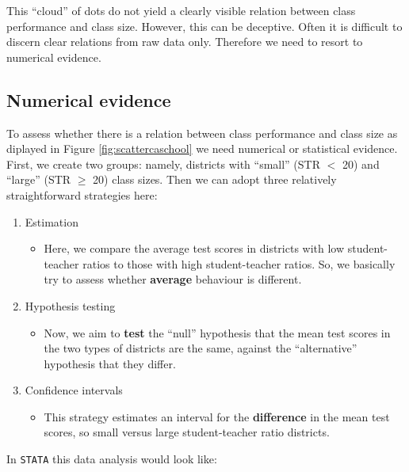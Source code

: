 \documentclass[
]{book}
\providecommand{\tightlist}{%
  \setlength{\itemsep}{0pt}\setlength{\parskip}{0pt}}
\begin{document}
This ``cloud'' of dots do not yield a clearly visible relation between class performance and class size. However, this can be deceptive. Often it is difficult to discern clear relations from raw data only. Therefore we need to resort to numerical evidence.

\hypertarget{sec:numevidence}{%
\subsection{Numerical evidence}\label{sec:numevidence}}

To assess whether there is a relation between class performance and class size as diplayed in Figure \ref{fig:scattercaschool} we need numerical or statistical evidence. First, we create two groups: namely, districts with ``small'' (STR \(<\) 20) and ``large'' (STR \(\geq\) 20) class sizes. Then we can adopt three relatively straightforward strategies here:

\begin{enumerate}
\def\labelenumi{\arabic{enumi}.}
\tightlist
\item
  Estimation

  \begin{itemize}
  \tightlist
  \item
    Here, we compare the average test scores in districts with low student-teacher ratios to those with high student-teacher ratios. So, we basically try to assess whether \textbf{average} behaviour is different.
  \end{itemize}
\item
  Hypothesis testing

  \begin{itemize}
  \tightlist
  \item
    Now, we aim to \textbf{test} the ``null'' hypothesis that the mean test scores in the two types of districts are the same, against the ``alternative'' hypothesis that they differ.
  \end{itemize}
\item
  Confidence intervals

  \begin{itemize}
  \tightlist
  \item
    This strategy estimates an interval for the \textbf{difference} in the mean test scores, so small versus large student-teacher ratio districts.
  \end{itemize}
\end{enumerate}

In \texttt{STATA} this data analysis would look like:
\end{document}
